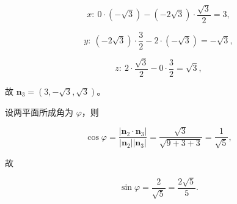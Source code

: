 \begin{answer}
\nopagebreak[4]
\[x:\ 0\cdot(-\sqrt3)-(-2\sqrt3)\cdot\frac{\sqrt3}2=3,\]

\nopagebreak[4]
\[y:\ (-2\sqrt3)\cdot\frac32-2\cdot(-\sqrt3)=-\sqrt3,\]

\nopagebreak[4]
\[z:\ 2\cdot\frac{\sqrt3}2-0\cdot\frac32=\sqrt3,\]

故 $\boldsymbol n_3=(3,-\sqrt3,\sqrt3)$。

设两平面所成角为 $\varphi$，则

\nopagebreak[4]
\[\cos\varphi=\frac{|\boldsymbol n_2\cdot\boldsymbol n_3|}{|\boldsymbol n_2||\boldsymbol n_3|}
=\frac{\sqrt3}{\sqrt{9+3+3}}=\frac1{\sqrt5},\]

故

\nopagebreak[4]
\[\sin\varphi=\frac2{\sqrt5}=\frac{2\sqrt5}5.\]


\end{answer}
